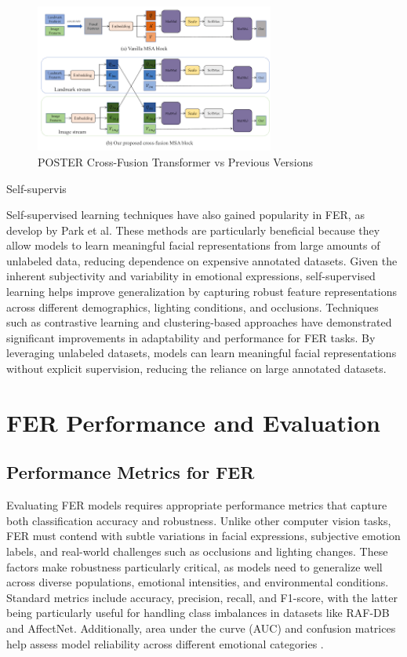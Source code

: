 \begin{figure}[H]
\centering
   \includegraphics[width=0.70\textwidth]{../images/poster_cross_function.png}
\caption{POSTER Cross-Fusion Transformer vs Previous Versions}
\label{fig:poster_cross_function}
\end{figure}
	

Self-supervis

Self-supervised learning techniques have also gained popularity in FER, as develop by Park et al\cite{park_what_2023}. These methods are particularly beneficial because they allow models to learn meaningful facial representations from large amounts of unlabeled data, reducing dependence on expensive annotated datasets. Given the inherent subjectivity and variability in emotional expressions, self-supervised learning helps improve generalization by capturing robust feature representations across different demographics, lighting conditions, and occlusions. Techniques such as contrastive learning and clustering-based approaches have demonstrated significant improvements in adaptability and performance for FER tasks. By leveraging unlabeled datasets, models can learn meaningful facial representations without explicit supervision, reducing the reliance on large annotated datasets. 



\section{FER Performance and Evaluation}


\subsection{Performance Metrics for FER}

Evaluating FER models requires appropriate performance metrics that capture both classification accuracy and robustness. Unlike other computer vision tasks, FER must contend with subtle variations in facial expressions, subjective emotion labels, and real-world challenges such as occlusions and lighting changes. These factors make robustness particularly critical, as models need to generalize well across diverse populations, emotional intensities, and environmental conditions. Standard metrics include accuracy, precision, recall, and F1-score, with the latter being particularly useful for handling class imbalances in datasets like RAF-DB and AffectNet. Additionally, area under the curve (AUC) and confusion matrices help assess model reliability across different emotional categories \cite{ma_facial_2023}.

